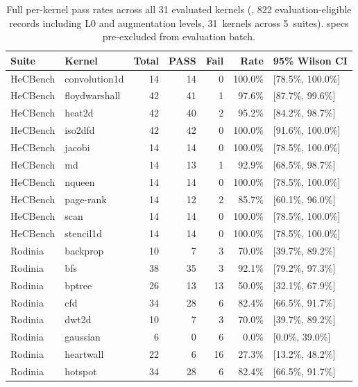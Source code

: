 \begin{table}[!htbp]
\centering
\caption{Full per-kernel pass rates across all 31 evaluated kernels (\gptnew{}, 822 evaluation-eligible records including L0 and augmentation levels, 31~kernels across 5~suites). \knownfail{} specs pre-excluded from evaluation batch.}
\label{tab:per-kernel-full-gpt54}
\footnotesize
\begin{tabular}{@{}llrrrrl@{}}
\toprule
Suite & Kernel & Total & PASS & Fail & Rate & 95\% Wilson CI \\
\midrule
HeCBench & convolution1d & 14 & 14 & 0 & 100.0\% & [78.5\%, 100.0\%] \\
HeCBench & floydwarshall & 42 & 41 & 1 & 97.6\% & [87.7\%, 99.6\%] \\
HeCBench & heat2d & 42 & 40 & 2 & 95.2\% & [84.2\%, 98.7\%] \\
HeCBench & iso2dfd & 42 & 42 & 0 & 100.0\% & [91.6\%, 100.0\%] \\
HeCBench & jacobi & 14 & 14 & 0 & 100.0\% & [78.5\%, 100.0\%] \\
HeCBench & md & 14 & 13 & 1 & 92.9\% & [68.5\%, 98.7\%] \\
HeCBench & nqueen & 14 & 14 & 0 & 100.0\% & [78.5\%, 100.0\%] \\
HeCBench & page-rank & 14 & 12 & 2 & 85.7\% & [60.1\%, 96.0\%] \\
HeCBench & scan & 14 & 14 & 0 & 100.0\% & [78.5\%, 100.0\%] \\
HeCBench & stencil1d & 14 & 14 & 0 & 100.0\% & [78.5\%, 100.0\%] \\
\midrule
Rodinia & backprop & 10 & 7 & 3 & 70.0\% & [39.7\%, 89.2\%] \\
Rodinia & bfs & 38 & 35 & 3 & 92.1\% & [79.2\%, 97.3\%] \\
Rodinia & bptree & 26 & 13 & 13 & 50.0\% & [32.1\%, 67.9\%] \\
Rodinia & cfd & 34 & 28 & 6 & 82.4\% & [66.5\%, 91.7\%] \\
Rodinia & dwt2d & 10 & 7 & 3 & 70.0\% & [39.7\%, 89.2\%] \\
Rodinia & gaussian & 6 & 0 & 6 & 0.0\% & [0.0\%, 39.0\%] \\
Rodinia & heartwall & 22 & 6 & 16 & 27.3\% & [13.2\%, 48.2\%] \\
Rodinia & hotspot & 34 & 28 & 6 & 82.4\% & [66.5\%, 91.7\%] \\

\end{tabular}
\end{table}
